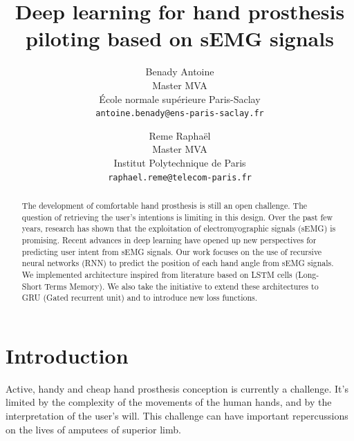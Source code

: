 \documentclass[final]{cvpr}
\begin{document}
\title{Deep learning for hand prosthesis piloting based on sEMG signals}

\author{Benady Antoine\\
Master MVA\\
École normale supérieure Paris-Saclay\\
{\tt\small antoine.benady@ens-paris-saclay.fr}
\and
Reme Raphaël\\
Master MVA\\
Institut Polytechnique de Paris\\
{\tt\small raphael.reme@telecom-paris.fr}
}

\maketitle

\begin{abstract}
  The development of comfortable hand prosthesis is still an open challenge. The question of retrieving the user's intentions is limiting in this design. Over the past few years, research has shown that the exploitation of electromyographic signals (sEMG) is promising. Recent advances in deep learning have opened up new perspectives for predicting user intent from sEMG signals. Our work focuses on the use of recursive neural networks (RNN) to predict the position of each hand angle from sEMG signals. 
  We implemented architecture inspired from literature based on LSTM cells (Long-Short Terms Memory). 
 We also take the initiative to extend these architectures to GRU (Gated recurrent unit) and to introduce new loss functions.
 
\end{abstract}

\section{Introduction}

Active, handy and cheap hand prosthesis conception is currently a challenge. It’s limited by the complexity of the movements of the human hands, and by the interpretation of the user’s will. This challenge can have important repercussions on the lives of amputees of superior limb.\\
\end{document}
